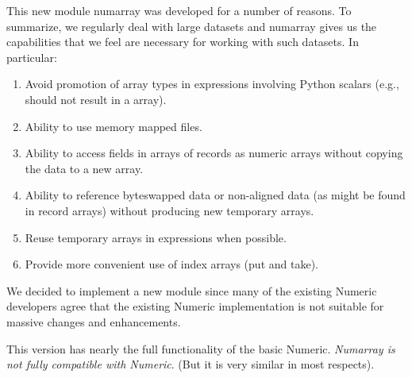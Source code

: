 This new module numarray was developed for a number of reasons. To 
summarize, we regularly deal with large datasets and numarray gives us the
capabilities that we feel are necessary for working with such datasets. In
particular:
\begin{enumerate}
\item Avoid promotion of array types in expressions involving Python scalars
   (e.g.,  should not result in a 
   array).
\item Ability to use memory mapped files.
\item Ability to access fields in arrays of records as numeric arrays without
   copying the data to a new array.
\item Ability to reference byteswapped data or non-aligned data (as might be
   found in record arrays) without producing new temporary arrays.
\item Reuse temporary arrays in expressions when possible.
\item Provide more convenient use of index arrays (put and take).
\end{enumerate}
We decided to implement a new module since many of the existing Numeric
developers agree that the existing Numeric implementation is not suitable 
for massive changes and enhancements.

This version has nearly the full functionality of the basic Numeric.
\emph{Numarray is not fully compatible with Numeric}.
(But it is very similar in most respects).

